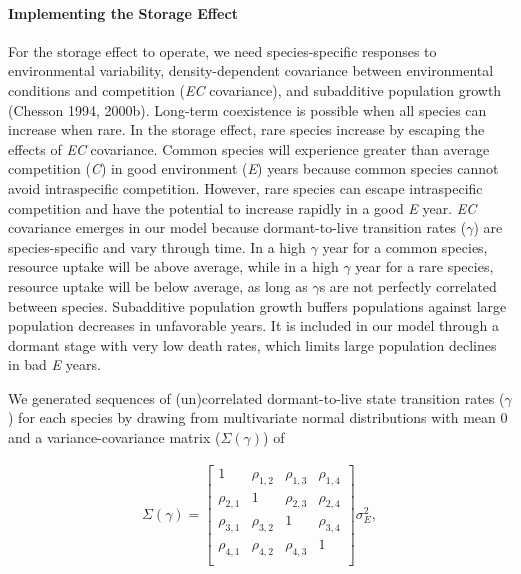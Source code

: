 \documentclass[12pt,]{article}
\let\oldparagraph\paragraph
\renewcommand{\paragraph}[1]{\oldparagraph{#1}\mbox{}}
\begin{document}
\paragraph{Implementing the Storage
Effect}\label{implementing-the-storage-effect}

For the storage effect to operate, we need species-specific responses to
environmental variability, density-dependent covariance between
environmental conditions and competition (\emph{EC} covariance), and
subadditive population growth (Chesson 1994, 2000b). Long-term
coexistence is possible when all species can increase when rare. In the
storage effect, rare species increase by escaping the effects of
\emph{EC} covariance. Common species will experience greater than
average competition (\emph{C}) in good environment (\emph{E}) years
because common species cannot avoid intraspecific competition. However,
rare species can escape intraspecific competition and have the potential
to increase rapidly in a good \emph{E} year. \emph{EC} covariance
emerges in our model because dormant-to-live transition rates
(\(\gamma\)) are species-specific and vary through time. In a high
\(\gamma\) year for a common species, resource uptake will be above
average, while in a high \(\gamma\) year for a rare species, resource
uptake will be below average, as long as \(\gamma\)s are not perfectly
correlated between species.
Subadditive population growth buffers populations against large
population decreases in unfavorable years. It is included in our model
through a dormant stage with very low death rates, which limits large
population declines in bad \emph{E} years.

We generated sequences of (un)correlated dormant-to-live state
transition rates (\(\gamma\)) for each species by drawing from
multivariate normal distributions with mean 0 and a variance-covariance
matrix (\(\Sigma(\gamma)\)) of \vspace{-3em}

\begin{align}
\Sigma(\gamma) = 
\begin{bmatrix}
1 & \rho_{1,2} & \rho_{1,3} & \rho_{1,4} \\
\rho_{2,1} & 1 & \rho_{2,3} & \rho_{2,4} \\
\rho_{3,1} & \rho_{3,2} & 1  & \rho_{3,4} \\
\rho_{4,1} & \rho_{4,2} & \rho_{4,3} & 1  \\
\end{bmatrix}
\sigma_{E}^2,
\end{align}\vspace{-2em}
\end{document}
